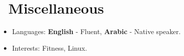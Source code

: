 \section{\texorpdfstring{\faInfo}{}\ Miscellaneous}
\begin{itemize}[parsep=0.5ex]
  \item Languages: \textbf{English} - Fluent, \textbf{Arabic} - Native speaker.
  \item Interests: Fitness, Linux.
\end{itemize}